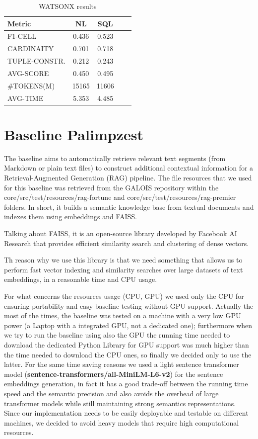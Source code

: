 \documentclass[12pt,a4paper]{article}
\begin{document}
\begin{table}[h]
\centering
\begin{tabular}{lcccc}
\toprule
\textbf{Metric} & \textbf{NL} & \textbf{SQL}  \\
\midrule
F1-CELL & 0.436 & 0.523  \\
CARDINAITY & 0.701 & 0.718  \\
TUPLE-CONSTR. & 0.212 & 0.243  \\
AVG-SCORE & 0.450 & 0.495  \\
\#TOKENS(M) & 15165 & 11606  \\
AVG-TIME & 5.353 & 4.485  \\

\bottomrule
\end{tabular}
\caption{WATSONX results}
\label{watsonx_results}
\end{table}


\section{Baseline Palimpzest}
The baseline aims to automatically retrieve relevant text segments (from Markdown or plain text files) to construct additional contextual information for a Retrieval-Augmented Generation (RAG) pipeline.
The file resources that we used for this baseline was retrieved from the GALOIS repository within the core/src/test/resources/rag-fortune and core/src/test/resources/rag-premier folders.
In short, it builds a semantic knowledge base from textual documents and indexes them using embeddings and FAISS.

Talking about FAISS, it is an open-source library developed by Facebook AI Research that provides efficient similarity search and clustering of dense vectors.

Th reason why we use this library is that we need something that allows us to perform fast vector indexing and similarity searches over large datasets of text embeddings, in a reasonable time and CPU usage.

For what concerns the resources usage (CPU, GPU) we used only the CPU for ensuring portability and easy baseline testing without GPU support.
Actually the most of the times, the baseline was tested on a machine with a very low GPU power (a Laptop with a integrated GPU, not a dedicated one); furthermore when we try to run the baseline using also the GPU the running time needed to download the dedicated Python Library for GPU support was much higher than the time needed to download the CPU ones, so finally we decided only to use the latter.
For the same time saving reasons we used a light sentence transformer model (\textbf{sentence-transformers/all-MiniLM-L6-v2}) for the sentence embeddings generation, in fact it has a good trade-off between the running time speed and the semantic precision and also avoids the overhead of large transformer models while still maintaining strong semantics representations.
\\Since our implementation needs to be easily deployable and testable on different machines, we decided to avoid heavy models that require high computational resources.
\end{document}
